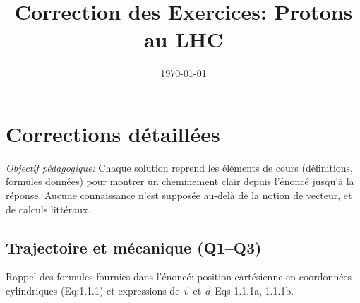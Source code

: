 \documentclass[11pt,a4paper]{article}
\title{Correction des Exercices: Protons au LHC}
\author{ }
\date{\today}
\begin{document}
\maketitle
\bigskip

\section*{Corrections détaillées}
\textit{Objectif pédagogique:} Chaque solution reprend les éléments de cours (définitions, formules données) pour montrer un cheminement clair depuis l'énoncé jusqu'à la réponse. Aucune connaissance n'est supposée au-delà de la notion de vecteur, et de calculs littéraux.

\subsection*{Trajectoire et mécanique (Q1--Q3)}
Rappel des formules fournies dans l'énoncé: position cartésienne en coordonnées cylindriques (Eq:1.1.1) et expressions de $\vec v$ et $\vec a$ Eqs 1.1.1a, 1.1.1b.
\end{document}
